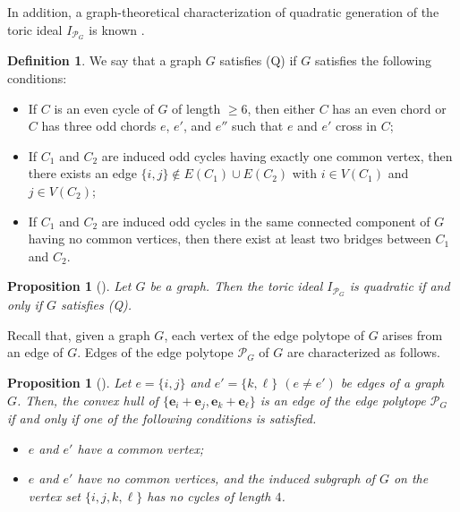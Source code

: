 \documentclass[12pt]{amsart}
\newtheorem{prop}[thm]{Proposition}
\theoremstyle{definition}
\newtheorem{definition}[thm]{Definition}
\numberwithin{thm}{section}
\numberwithin{equation}{section}
\def\epoly{{\mathcal P}_G}
\def\eb{{\mathbf e}}
\begin{document}
In addition, a graph-theoretical characterization of quadratic generation of the toric ideal $I_{\epoly}$ is known \cite{OHquad}.

\begin{definition}
We say that a graph $G$ satisfies (Q) if $G$ satisfies the following conditions:
\begin{itemize}
    \item[(i)]
    If $C$ is an even cycle of $G$ of length $\ge 6$, then either 
    $C$ has an even chord or $C$ has three odd chords $e$, $e'$, and $e''$ such that $e $ and $e'$ cross in $C$;
\item[(ii)]
If $C_1$ and $C_2$ are induced odd cycles having exactly one common
 vertex, then there exists an edge $\{i,j\} \notin  E(C_1) \cup E(C_2)$
 with $i \in V(C_1)$ and $j \in V(C_2)$;
\item[(iii)]
If $C_1$ and $C_2$ are induced odd cycles in the same connected component of $G$ having no common vertices,
then there exist at least two bridges between $C_1$ and $C_2$.
  
\end{itemize}
\end{definition}

\begin{prop}[{\cite[Theorem 1.2]{OHquad}}] \label{edgepolyquad}
Let $G$ be a graph. Then the toric ideal $I_{\epoly}$ is quadratic if and only if $G$ satisfies (Q).
\end{prop}

Recall that, given a graph $G$, each vertex of the edge polytope of $G$ arises from an edge of $G$.
Edges of the edge polytope $\epoly$ of $G$ are characterized as follows.
    
\begin{prop}[{\cite[Lemma 1.4]{OHsimple}}] \label{edge of edge}
     Let $e = \{i,j\}$ and $e'=\{k,\ell\}$ $(e \ne e')$ be edges of a graph $G$.
     Then, the convex hull of $\{\eb_i+\eb_j, \eb_k+\eb_\ell\}$ is an edge of the edge polytope $\epoly$
     if and only if one of the following
 conditions is satisfied.
 \begin{itemize}
     \item[(i)]
$e$ and $e'$ have a common vertex{\rm ;}
     \item[(ii)]
      $e$ and $e'$ have no common vertices, and the induced subgraph of $G$ on the vertex set $\{i,j,k,\ell\}$ has no cycles of length $4$.
 \end{itemize}
\end{prop}
\end{document}
